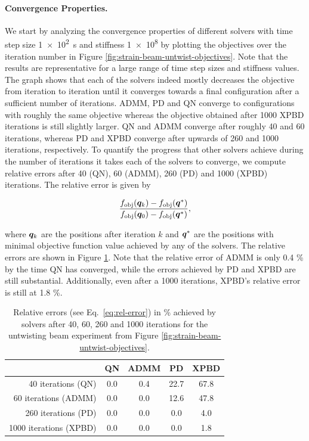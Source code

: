 \paragraph{Convergence Properties.}
We start by analyzing the convergence properties of different solvers with time step size \SI{1e2}{\second} and stiffness \num{1e8} by plotting the objectives over the 
iteration number in Figure \ref{fig:strain-beam-untwist-objectives}. Note that the results are representative for a large range of time step sizes and stiffness 
values. The graph shows that each of the solvers indeed mostly decreases the objective from iteration to iteration until it converges towards a final configuration 
after a sufficient number of iterations. ADMM, PD and QN converge to configurations with roughly the same objective whereas the objective obtained after 1000 
XPBD iterations is still slightly larger. QN and ADMM converge after roughly 40 and 60 iterations, whereas PD and XPBD converge after upwards of 260 and 1000 iterations, 
respectively. To quantify the progress that other solvers achieve during the number of iterations it takes each of the solvers to converge, we compute relative errors after 
40 (QN), 60 (ADMM), 260 (PD) and 1000 (XPBD) iterations. The relative error is given by 

\begin{equation}\label{eq:rel-error}
    \frac{f_{\text{obj}}(\bm{q}_k) - f_{\text{obj}}(\bm{q}^*)}{f_{\text{obj}}(\bm{q}_0) - f_{\text{obj}}(\bm{q}^*)},
\end{equation}

\noindent where $\bm{q}_k$ are the positions after iteration $k$ and $\bm{q}^*$ are the positions with minimal objective function value
achieved by any of the solvers. The relative errors are shown in Figure \ref{fig:rel-errors}. Note that the relative error of ADMM is only 
0.4 \% by the time QN has converged, while the errors achieved by PD and XPBD are still substantial. Additionally, even after a 1000 iterations, XPBD's relative error 
is still at 1.8 \%.

\begin{table}[h]
\centering
\begin{tabular}{ |r||c|c|c|c| } 
 \hline
 & QN & ADMM & PD & XPBD\\
 \hline
 \hline
    40 iterations (QN) & 0.0 & 0.4 & 22.7 & 67.8 \\ 
    60 iterations (ADMM) & 0.0 & 0.0 & 12.6 & 47.8 \\
    260 iterations (PD) & 0.0 & 0.0 & 0.0 & 4.0 \\
    1000 iterations (XPBD) & 0.0 & 0.0 & 0.0 & 1.8 \\ 
 \hline
\end{tabular}
\caption{Relative errors (see Eq.\ \ref{eq:rel-error}) in \% achieved by solvers after 40, 60, 260 and 1000 iterations for the untwisting beam experiment from 
Figure \ref{fig:strain-beam-untwist-objectives}.}
\label{fig:rel-errors}
\end{table}

